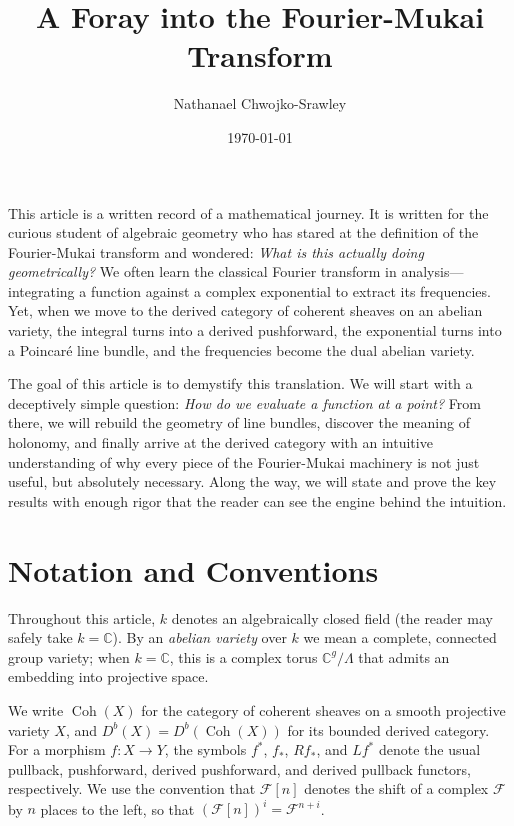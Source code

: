 \documentclass{article}
\title{A Foray into the Fourier-Mukai Transform}
\author{Nathanael Chwojko-Srawley}
\date{\today}
\renewcommand{\maketitle}{
    \quad
    \vspace{1em}
  \begin{center}
      \LARGE\bfseries \thetitle \par
      \vspace{0.6em}
      \large
  \end{center}
    \vspace{1em}
}
\newcommand{\C}{{\mathbb{C}}}
\newcommand{\CF}{{\mathcal{F}}}
\newcommand{\qn}{\quad\newline}
\newcommand{\Coh}{\operatorname{Coh}}
\begin{document}
\maketitle

\vspace{2em}
This article is a written record of a mathematical journey. It is written for the curious student of algebraic geometry who has stared at the definition of the Fourier-Mukai transform and wondered: \emph{What is this actually doing geometrically?} We often learn the classical Fourier transform in analysis---integrating a function against a complex exponential to extract its frequencies. Yet, when we move to the derived category of coherent sheaves on an abelian variety, the integral turns into a derived pushforward, the exponential turns into a Poincar\'{e} line bundle, and the frequencies become the dual abelian variety.

The goal of this article is to demystify this translation. We will start with a deceptively simple question: \emph{How do we evaluate a function at a point?} From there, we will rebuild the geometry of line bundles, discover the meaning of holonomy, and finally arrive at the derived category with an intuitive understanding of why every piece of the Fourier-Mukai machinery is not just useful, but absolutely necessary. Along the way, we will state and prove the key results with enough rigor that the reader can see the engine behind the intuition.

\qn
\vspace{2em}

\section{Notation and Conventions}

Throughout this article, $k$ denotes an algebraically closed field (the reader may safely take $k = \C$). By an \emph{abelian variety} over $k$ we mean a complete, connected group variety; when $k = \C$, this is a complex torus $\C^g / \Lambda$ that admits an embedding into projective space.

We write $\Coh(X)$ for the category of coherent sheaves on a smooth projective variety $X$, and $D^b(X) = D^b(\Coh(X))$ for its bounded derived category. For a morphism $f\colon X \to Y$, the symbols $f^*$, $f_*$, $Rf_*$, and $Lf^*$ denote the usual pullback, pushforward, derived pushforward, and derived pullback functors, respectively. We use the convention that $\CF[n]$ denotes the shift of a complex $\CF$ by $n$ places to the left, so that $(\CF[n])^i = \CF^{n+i}$.
\end{document}
